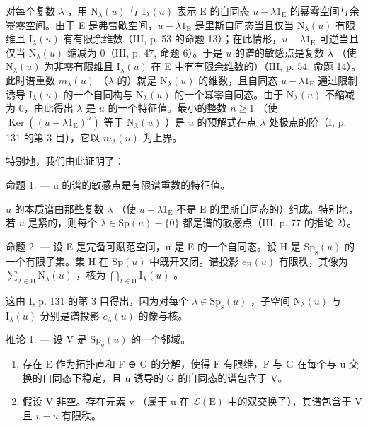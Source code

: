 对每个复数 \(\lambda\) ，用 \(\mathrm{N}_{\lambda}(u)\) 与 \(\mathrm{I}_{\lambda}(u)\) 表示 E 的自同态 \(u - \lambda 1_{\mathrm{E}}\) 的幂零空间与余幂零空间。由于 E 是弗雷歇空间，\(u - \lambda 1_{\mathrm{E}}\) 是里斯自同态当且仅当 \(\mathrm{N}_{\lambda}(u)\) 有限维且 \(\mathrm{I}_{\lambda}(u)\) 有有限余维数（III, p. 53 的命题 13）；在此情形，\(u - \lambda 1_{\mathrm{E}}\) 可逆当且仅当 \(\mathrm{N}_{\lambda}(u)\) 缩减为 0（III, p. 47, 命题 6）。于是 \(u\) 的谱的敏感点是复数 \(\lambda\) （使 \(\mathrm{N}_{\lambda}(u)\) 为非零有限维且 \(\mathrm{I}_{\lambda}(u)\) 在 E 中有有限余维数的）（III, p. 54, 命题 14）。此时谱重数 \(m_{\lambda}(u)\) （\(\lambda\) 的）就是 \(\mathrm{N}_{\lambda}(u)\) 的维数，且自同态 \(u - \lambda 1_{\mathrm{E}}\) 通过限制诱导 \(\mathrm{I}_{\lambda}(u)\) 的一个自同构与 \(\mathrm{N}_{\lambda}(u)\) 的一个幂零自同态。由于 \(\mathrm{N}_{\lambda}(u)\) 不缩减为 0，由此得出 \(\lambda\) 是 \(u\) 的一个特征值。最小的整数 \(n \geqslant 1\) （使 \(\operatorname{Ker}((u - \lambda 1_{\mathrm{E}})^n)\) 等于 \(\mathrm{N}_{\lambda}(u)\) ）是 \(u\) 的预解式在点 \(\lambda\) 处极点的阶（I, p. 131 的第 3 目），它以 \(m_{\lambda}(u)\) 为上界。

特别地，我们由此证明了：

命题 1. --- u 的谱的敏感点是有限谱重数的特征值。

\(u\) 的本质谱由那些复数 \(\lambda\) （使 \(u - \lambda 1_{\mathrm{E}}\) 不是 E 的里斯自同态的）组成。特别地，若 \(u\) 是紧的，则每个 \(\lambda \in \mathrm{Sp}(u) - \{0\}\) 都是谱的敏感点（III, p. 77 的推论 2）。

命题 2. --- 设 E 是完备可赋范空间，u 是 E 的一个自同态。设 H 是 \(\mathrm{Sp}_{\mathrm{s}}(u)\) 的一个有限子集。集 H 在 \(\mathrm{Sp}(u)\) 中既开又闭。谱投影 \(e_{\mathrm{H}}(u)\) 有限秩，其像为 \(\sum_{\lambda \in \mathrm{H}}\mathrm{N}_{\lambda}(u)\) ，核为 \(\bigcap_{\lambda \in \mathrm{H}}\mathrm{I}_{\lambda}(u)\) 。

这由 I, p. 131 的第 3 目得出，因为对每个 \(\lambda \in \mathrm{Sp}_{\mathrm{s}}(u)\) ，子空间 \(\mathrm{N}_{\lambda}(u)\) 与 \(\mathrm{I}_{\lambda}(u)\) 分别是谱投影 \(e_{\lambda}(u)\) 的像与核。

推论 1. --- 设 V 是 \(\mathrm{Sp_e}(u)\) 的一个邻域。

\begin{enumerate}
\def\labelenumi{\alph{enumi})}
\item
  存在 E 作为拓扑直和 F ⊕ G 的分解，使得 F 有限维，F 与 G 在每个与 u 交换的自同态下稳定，且 u 诱导的 G 的自同态的谱包含于 V。
\item
  假设 V 非空。存在元素 v （属于 u 在 \(\mathcal{L}(\mathrm{E})\) 中的双交换子），其谱包含于 V 且 \(v - u\) 有限秩。
\end{enumerate}

